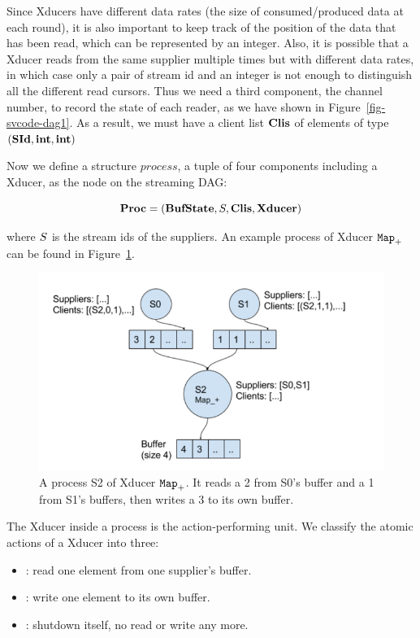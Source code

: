 Since Xducers have different data rates (the size of consumed/produced data at each round), it is also important to keep track of the position of the data that has been read, which can be represented by an integer.
Also, it is possible that a Xducer reads from the same supplier multiple times but with different data rates, in which case only a pair of stream id and an integer is not enough to distinguish all the different read cursors. 
Thus we need a third component, the channel number, to record the state of each reader, as we have shown in Figure~\ref{fig-svcode-dag1}.
As a result, we must have a client list $\clis$ of elements of type $(\SId, \int, \int) $

Now we define a structure $process$, a tuple of four components including a Xducer, as the node on the streaming DAG:

$$ \proc  =  (\bufst, \S, \clis, \xducer) $$

where $\S$ is the stream ids of the suppliers. An example process of Xducer $\map{+}$ can be found in Figure~\ref{fig:process}.

\begin{figure}
	\centering
	\includegraphics[width=0.9\linewidth]{fig/process}
	\caption{A process S2 of Xducer $\map{+}$. 
		It reads a 2 from S0's buffer and a 1 from S1's buffers, then writes a 3 to its own buffer.}
	\label{fig:process}
\end{figure}

The Xducer inside a process is the action-performing unit. 
We classify the atomic actions of a Xducer into three:
\begin{itemize}
	\item \pin: read one element from one supplier's buffer.
	\item \pout : write one element to its own buffer.
	\item \done: shutdown itself, no read or write any more.
\end{itemize}

